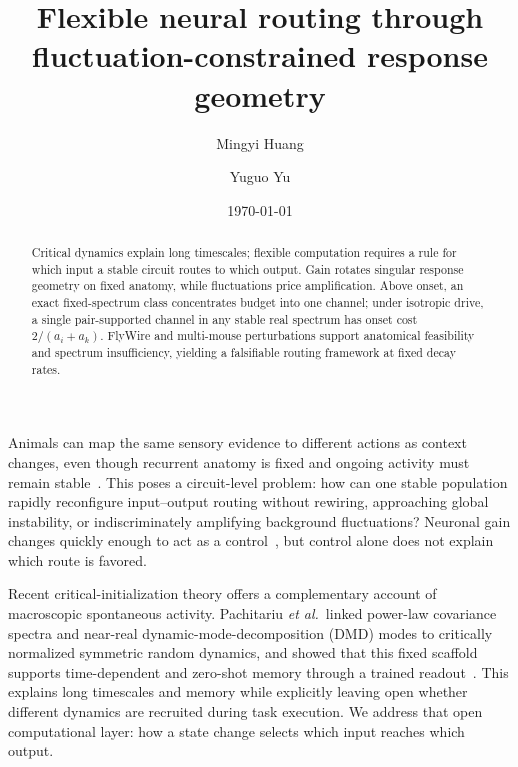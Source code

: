 \documentclass[
  aps,prl,reprint,superscriptaddress,nofootinbib,longbibliography,floatfix,
  amsmath,amssymb
]{revtex4-2}
\begin{document}
\title{Flexible neural routing through fluctuation-constrained response geometry}

\author{Mingyi Huang}

\author{Yuguo Yu}

\date{\today}

\begin{abstract}
Critical dynamics explain long timescales; flexible computation requires
a rule for which input a stable circuit routes to which output.  Gain rotates
singular response geometry on fixed anatomy, while fluctuations price
amplification.  Above onset, an exact fixed-spectrum class concentrates
budget into one channel; under isotropic drive, a single pair-supported channel
in any stable real spectrum has onset cost $2/(a_i+a_k)$.  FlyWire and
multi-mouse perturbations support anatomical feasibility and spectrum
insufficiency, yielding a falsifiable routing framework at fixed decay rates.
\end{abstract}

\maketitle

Animals can map the same sensory evidence to different actions as context
changes, even though recurrent anatomy is fixed and ongoing activity must
remain stable~\cite{mante2013context}.  This poses a circuit-level problem: how
can one stable population rapidly reconfigure input--output routing without
rewiring, approaching global instability, or indiscriminately amplifying
background fluctuations?  Neuronal gain changes quickly enough to act as a
control~\cite{ferguson2020gain}, but control alone does not explain which route
is favored.

Recent critical-initialization theory offers a complementary account of
macroscopic spontaneous activity.  Pachitariu \emph{et al.}\ linked power-law
covariance spectra and near-real dynamic-mode-decomposition (DMD) modes to
critically normalized symmetric random dynamics, and showed that this fixed
scaffold supports time-dependent and zero-shot memory through a trained
readout~\cite{pachitariu2026critical}.  This explains long timescales and memory
while explicitly leaving open whether different dynamics are recruited during
task execution.  We address that open computational layer: how a state change
selects which input reaches which output.
\end{document}
